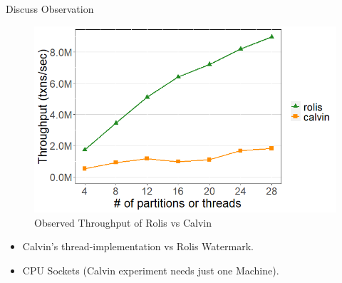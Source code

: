 \documentclass[xcolor=dvipsnames]{beamer}
\begin{document}
    \begin{frame}{Discuss Observation}

        \begin{figure}
            \includegraphics[scale=0.4]{fig12.png}
            \caption{Observed Throughput of Rolis vs Calvin}
        \end{figure}

        \begin{itemize}
            \item Calvin's thread-implementation vs Rolis Watermark.
            \item CPU Sockets (Calvin experiment needs just one Machine).
        \end{itemize}


    \end{frame}
\end{document}
